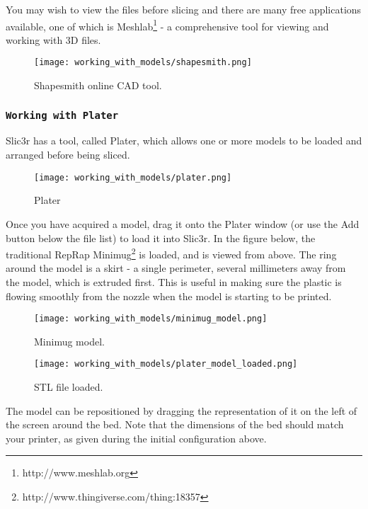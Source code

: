 You may wish to view the files before slicing and there are many free applications available, one of which is Meshlab\footnote{http://www.meshlab.org} - a comprehensive tool for viewing and working with 3D files.

\begin{figure}[H]
\centering
\texttt{[image: working\_with\_models/shapesmith.png]}
\caption{Shapesmith online CAD tool.}
\label{fig:shapesmith}
\end{figure}



\subsubsection{\texttt{Working with Plater}} %
\label{sub:working_with_plater}
Slic3r has a tool, called Plater, which allows one or more models to be loaded and arranged before being sliced.

\begin{figure}[H]
\centering
\texttt{[image: working\_with\_models/plater.png]}
\caption{Plater}
\label{fig:plater}
\end{figure}

Once you have acquired a model, drag it onto the Plater window (or use the Add button below the file list) to load it into Slic3r.  In the figure below, the traditional RepRap Minimug\footnote{http://www.thingiverse.com/thing:18357} is loaded, and is viewed from above. The ring around the model is a skirt - a single perimeter, several millimeters away from the model, which is extruded first.  This is useful in making sure the plastic is flowing smoothly from the nozzle when the model is starting to be printed.

\begin{figure}[H]
\centering
\texttt{[image: working\_with\_models/minimug\_model.png]}
\caption{Minimug model.}
\label{fig:minimug_model}
\end{figure}

\begin{figure}[H]
\centering
\texttt{[image: working\_with\_models/plater\_model\_loaded.png]}
\caption{STL file loaded.}
\label{fig:plater_model_loaded}
\end{figure}

The model can be repositioned by dragging the representation of it on the left of the screen around the bed.  Note that the dimensions of the bed should match your printer, as given during the initial configuration above.

